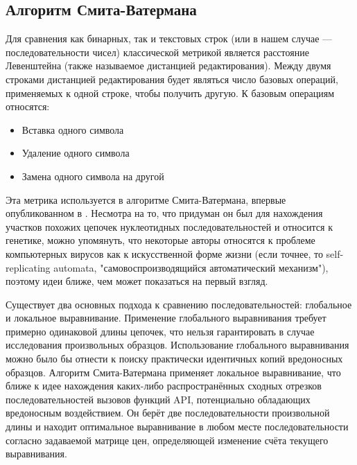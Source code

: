 \subsection {Алгоритм Смита-Ватермана}
Для сравнения как бинарных, так и текстовых строк (или в нашем случае --- последовательности чисел) классической метрикой является расстояние Левенштейна (также называемое дистанцией редактирования). Между двумя строками дистанцией редактирования будет являться число базовых операций, применяемых к одной строке, чтобы получить другую. К базовым операциям относятся:
\begin {itemize}
	\item Вставка одного символа
	\item Удаление одного символа
	\item Замена одного символа на другой
\end {itemize}
Эта  метрика используется в алгоритме Смита-Ватермана, впервые опубликованном в \cite{LOCALALIGNMENT}. Несмотра на то, что придуман он был для нахождения участков похожих цепочек нуклеотидных последовательностей и относится к генетике, можно упомянуть, что некоторые авторы \cite{BLACKBOOK} относятся к проблеме компьютерных вирусов как к искусственной форме жизни (если точнее, то self-replicating automata, "самовоспроизводящийся автоматический механизм"), поэтому идеи ближе, чем может показаться на первый взгляд.

Существует два основных подхода к сравнению последовательностей: глобальное и локальное выравнивание. Применение глобального выравнивания требует примерно одинаковой длины цепочек, что нельзя гарантировать в случае исследования произвольных образцов. Использование глобального выравнивания можно было бы отнести к поиску практически идентичных копий вредоносных образцов. Алгоритм Смита-Ватермана применяет локальное выравнивание, что ближе к идее нахождения каких-либо распространённых сходных отрезков последовательностей вызовов функций API, потенциально обладающих вредоносным воздействием. Он берёт две последовательности произвольной длины и находит оптимальное выравнивание в любом месте последовательности согласно задаваемой матрице цен, определяющей изменение счёта текущего выравнивания. 

